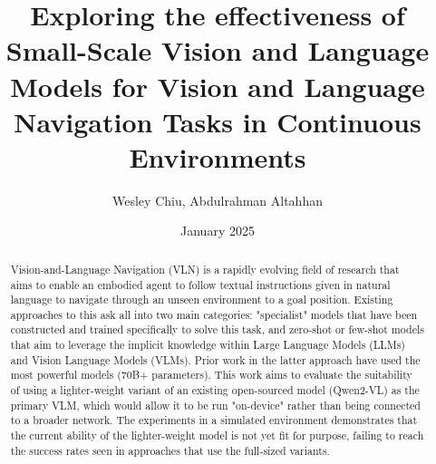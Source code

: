 \documentclass{svproc}
\title{Exploring the effectiveness of Small-Scale Vision and Language Models for Vision and Language Navigation Tasks in Continuous Environments}
\author{Wesley Chiu, Abdulrahman Altahhan}
\institute{University of Leeds, School of Computing, ODL MSc in AI, UK. \\ \texttt{\{od22wc, a.altahhan\}@leeds.ac.uk}}
\date{January 2025}
\begin{document}
\maketitle

\begin{abstract}
    Vision-and-Language Navigation (VLN) is a rapidly evolving field of research that aims to enable an embodied agent to follow textual instructions given in natural language to navigate through an unseen environment to a goal position. Existing approaches to this ask all into two main categories: "specialist" models that have been constructed and trained specifically to solve this task, and zero-shot or few-shot models that aim to leverage the implicit knowledge within Large Language Models (LLMs) and Vision Language Models  (VLMs). Prior work in the latter approach have used the most powerful models (70B+ parameters). This work aims to evaluate the suitability of using a lighter-weight variant of an existing open-sourced model (Qwen2-VL) as the primary VLM, which would allow it to be run "on-device" rather than being connected to a broader network. The experiments in a simulated environment demonstrates that the current ability of the lighter-weight model is not yet fit for purpose, failing to reach the success rates seen in approaches that use the full-sized variants.
    
\end{abstract}
\end{document}
